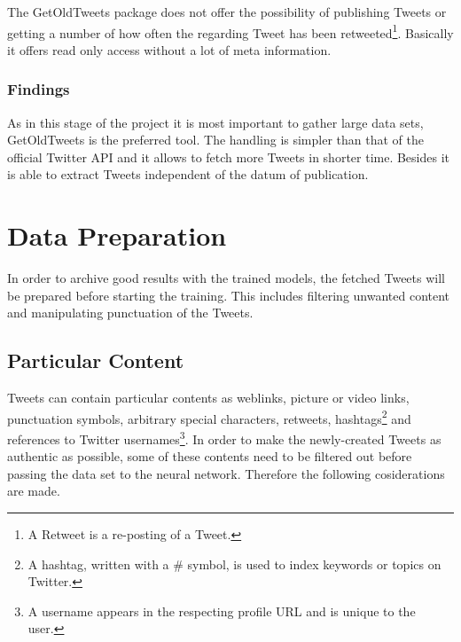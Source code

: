 \documentclass[conference]{IEEEtran}
\begin{document}
The GetOldTweets package does not offer the possibility of publishing Tweets or getting a number of how often the regarding Tweet has been retweeted\footnote{A Retweet is a re-posting of a Tweet.}. Basically it offers read only access without a lot of meta information.

\subsubsection{Findings}

As in this stage of the project it is most important to gather large data sets, GetOldTweets is the preferred tool. The handling is simpler than that of the official Twitter API and it allows to fetch more Tweets in shorter time. Besides it is able to extract Tweets independent of the datum of publication. 

%

\section{Data Preparation}

In order to archive good results with the trained models, the fetched Tweets will be prepared before starting the training. This includes filtering unwanted content and manipulating punctuation of the Tweets. 

\subsection{Particular Content}\label{subsec_particular_content}

Tweets can contain particular contents as weblinks, picture or video links, punctuation symbols, arbitrary special characters, retweets, hashtags\footnote{A hashtag, written with a \# symbol, is used to index keywords or topics on Twitter.} and references to Twitter usernames\footnote{A username appears in the respecting profile URL and is unique to the user.}. In order to make the newly-created Tweets as authentic as possible, some of these contents need to be filtered out before passing the data set to the neural network. Therefore the following cosiderations are made.\\
\end{document}

